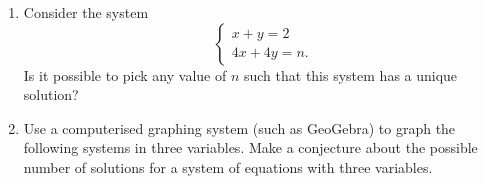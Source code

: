 \documentclass[a4paper,leqno]{article}
\numberwithin{equation}{section}
\theoremstyle{definition}
\theoremstyle{remark}
\begin{document}
\begin{enumerate}
\begin{center}
    \end{center}
  \item Consider the system
        \begin{equation*}
          \begin{cases}
            x + y = 2\\
            4x + 4y = n.
          \end{cases}
        \end{equation*}
        Is it possible to pick any value of $ n $ such that this system has a unique solution?
  \item Use a computerised graphing system (such as GeoGebra) to graph the following systems in three variables. Make a conjecture
        about the possible number of solutions for a system of equations with three variables.
    \begin{center}
      \hspace*{\fill}
\end{center}
\end{enumerate}
\end{document}
